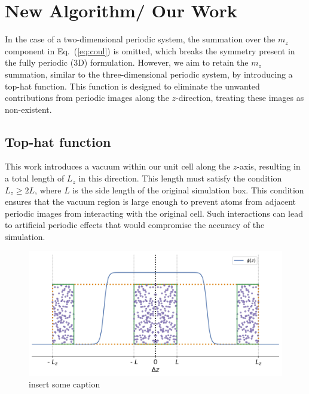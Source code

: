 
\chapter{New Algorithm/ Our Work}

\label{Chapter4}

In the case of a two-dimensional periodic system, the summation over the $m_z$ component in Eq.~(\ref{eq:coul}) is omitted, which breaks the symmetry present in the fully periodic (3D) formulation. However, we aim to retain the $m_z$ summation, similar to the three-dimensional periodic system, by introducing a top-hat function. This function is designed to eliminate the unwanted contributions from periodic images along the $z$-direction, treating these images as non-existent.
\section{Top-hat function}
This work introduces a vacuum within our unit cell along the $z$-axis, resulting in a total length of $ L_z$  in this direction. This length must satisfy the condition $L_z \geq 2L$, where $L$ is the side length of the original simulation box.
This condition ensures that the vacuum region is large enough to prevent atoms from adjacent periodic images from interacting with the original cell. Such interactions can lead to artificial periodic effects that would compromise the accuracy of the simulation.

\begin{figure}[]%
    \centering
    \includegraphics[width=\linewidth]{images/simulationcell.jpg}
    \caption{insert some caption}
    \label{fig:simulation_cell}
\end{figure}

